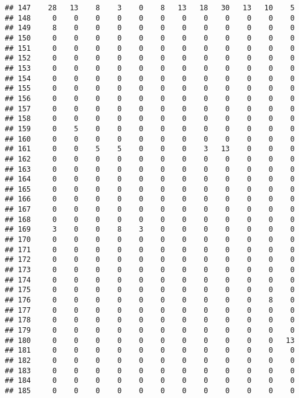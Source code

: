 \documentclass[]{article}
\begin{document}
\begin{verbatim}
## 147    28   13    8    3    0    8   13   18   30   13   10    5
## 148     0    0    0    0    0    0    0    0    0    0    0    0
## 149     8    0    0    0    0    0    0    0    0    0    0    0
## 150     0    0    0    0    0    0    0    0    0    0    0    0
## 151     0    0    0    0    0    0    0    0    0    0    0    0
## 152     0    0    0    0    0    0    0    0    0    0    0    0
## 153     0    0    0    0    0    0    0    0    0    0    0    0
## 154     0    0    0    0    0    0    0    0    0    0    0    0
## 155     0    0    0    0    0    0    0    0    0    0    0    0
## 156     0    0    0    0    0    0    0    0    0    0    0    0
## 157     0    0    0    0    0    0    0    0    0    0    0    0
## 158     0    0    0    0    0    0    0    0    0    0    0    0
## 159     0    5    0    0    0    0    0    0    0    0    0    0
## 160     0    0    0    0    0    0    0    0    0    0    0    0
## 161     0    0    5    5    0    0    0    3   13    0    0    0
## 162     0    0    0    0    0    0    0    0    0    0    0    0
## 163     0    0    0    0    0    0    0    0    0    0    0    0
## 164     0    0    0    0    0    0    0    0    0    0    0    0
## 165     0    0    0    0    0    0    0    0    0    0    0    0
## 166     0    0    0    0    0    0    0    0    0    0    0    0
## 167     0    0    0    0    0    0    0    0    0    0    0    0
## 168     0    0    0    0    0    0    0    0    0    0    0    0
## 169     3    0    0    8    3    0    0    0    0    0    0    0
## 170     0    0    0    0    0    0    0    0    0    0    0    0
## 171     0    0    0    0    0    0    0    0    0    0    0    0
## 172     0    0    0    0    0    0    0    0    0    0    0    0
## 173     0    0    0    0    0    0    0    0    0    0    0    0
## 174     0    0    0    0    0    0    0    0    0    0    0    0
## 175     0    0    0    0    0    0    0    0    0    0    0    0
## 176     0    0    0    0    0    0    0    0    0    0    8    0
## 177     0    0    0    0    0    0    0    0    0    0    0    0
## 178     0    0    0    0    0    0    0    0    0    0    0    0
## 179     0    0    0    0    0    0    0    0    0    0    0    0
## 180     0    0    0    0    0    0    0    0    0    0    0   13
## 181     0    0    0    0    0    0    0    0    0    0    0    0
## 182     0    0    0    0    0    0    0    0    0    0    0    0
## 183     0    0    0    0    0    0    0    0    0    0    0    0
## 184     0    0    0    0    0    0    0    0    0    0    0    0
## 185     0    0    0    0    0    0    0    0    0    0    0    0

\end{verbatim}
\end{document}

